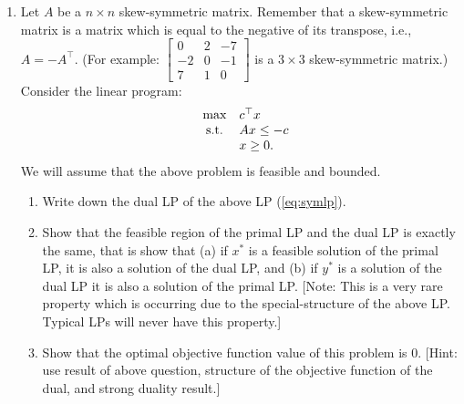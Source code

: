 \documentclass[11pt]{article}
\begin{document}
\begin{enumerate}
    \item Let $A$ be a $n \times n$ skew-symmetric matrix. Remember that a skew-symmetric matrix is a matrix which is equal to the negative of its transpose, i.e., $A = -A^{\top}$. (For example:  $\left[\begin{array}{ccc} 0 &2 &-7 \\ -2& 0 &-1\\ 7 &1 & 0\end{array}\right]$ is a $3 \times 3$ skew-symmetric matrix.) Consider the linear program:
\begin{eqnarray}\label{eq:symlp}
\begin{array}{rcl}
&\textup{max}& c^{\top}x \\
&\textup{s.t.}& Ax \leq -c \\
&& x \geq 0.
\end{array}
\end{eqnarray}
We will assume that the above problem is feasible and bounded. 
\begin{enumerate}
\item Write down the dual LP of the above LP (\ref{eq:symlp}).
\item Show that the feasible region of the primal LP and the dual LP is exactly the same, that is show that (a) if $x^*$ is a feasible solution of the primal LP, it is also a solution of the dual LP, and (b) if $y^*$ is a solution of the dual LP it is also a solution of the primal LP.  [Note: This is a very rare property which is occurring due to the special-structure of the above LP. Typical LPs will never have this property.]
\item Show that the optimal objective function value of this problem is $0$. [Hint: use result of above question, structure of the objective function of the dual, and strong duality result.]
\end{enumerate}


\end{enumerate}
\end{document}
